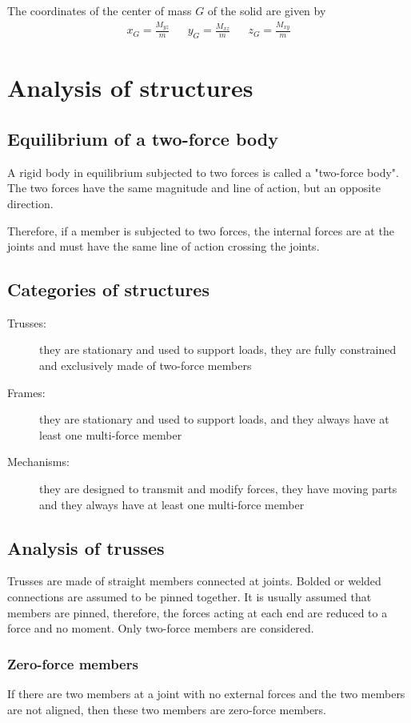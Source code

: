 \documentclass[10pt, twocolumn]{article}
\begin{document}
The coordinates of the center of mass \(G\) of the solid are given by
\begin{align*}
  x_G = \frac{M_{yz}}{m} &  & y_G = \frac{M_{xz}}{m} &  & z_G = \frac{M_{xy}}{m}
\end{align*}

\section{Analysis of structures}
\subsection{Equilibrium of a two-force body}
A rigid body in equilibrium subjected to two forces is called a "two-force body".
The two forces have the same magnitude and line of action, but an opposite direction.

Therefore, if a member is subjected to two forces, the internal forces are at the joints and must have the same line of action crossing the joints.

\subsection{Categories of structures}
\begin{description}
  \item[Trusses:] they are stationary and used to support loads, they are fully constrained and exclusively made of two-force members
  \item[Frames:] they are stationary and used to support loads, and they always have at least one multi-force member
  \item[Mechanisms:] they are designed to transmit and modify forces, they have moving parts and they always have at least one multi-force member
\end{description}

\subsection{Analysis of trusses}
Trusses are made of straight members connected at joints.
Bolded or welded connections are assumed to be pinned together.
It is usually assumed that members are pinned, therefore, the forces acting at each end are reduced to a force and no moment.
Only two-force members are considered.

\subsubsection{Zero-force members}
If there are two members at a joint with no external forces and the two members are not aligned, then these two members are zero-force members.
\end{document}
